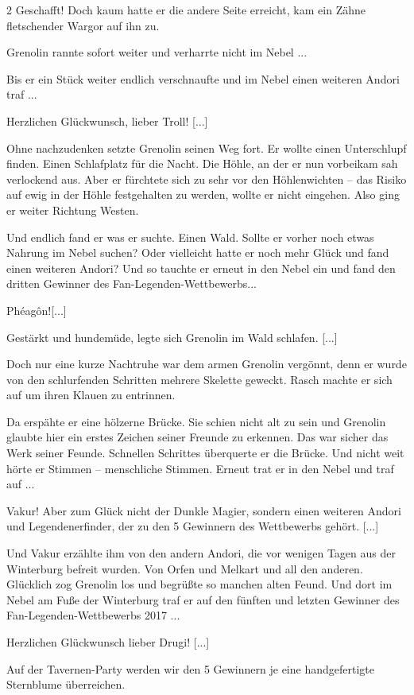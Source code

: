\documentclass[10pt, a4paper, oneside]{book}
\begin{document}
\begin{multicols}{2}
Geschafft! Doch kaum hatte er die andere Seite erreicht, kam ein Zähne fletschender Wargor auf ihn zu.

Grenolin rannte sofort weiter und verharrte nicht im Nebel ...

Bis er ein Stück weiter endlich verschnaufte und im Nebel einen weiteren Andori traf ...

Herzlichen Glückwunsch, lieber Troll! [...]

Ohne nachzudenken setzte Grenolin seinen Weg fort. Er wollte einen Unterschlupf finden. Einen Schlafplatz für die Nacht. Die Höhle, an der er nun vorbeikam sah verlockend aus. Aber er fürchtete sich zu sehr vor den Höhlenwichten – das Risiko auf ewig in der Höhle festgehalten zu werden, wollte er nicht eingehen. Also ging er weiter Richtung Westen.


Und endlich fand er was er suchte. Einen Wald. Sollte er vorher noch etwas Nahrung im Nebel suchen? Oder vielleicht hatte er noch mehr Glück und fand einen weiteren Andori?
Und so tauchte er erneut in den Nebel ein und fand den dritten Gewinner des Fan-Legenden-Wettbewerbs...

Phéagôn![...]

Gestärkt und hundemüde, legte sich Grenolin im Wald schlafen. [...]

Doch nur eine kurze Nachtruhe war dem armen Grenolin vergönnt, denn er wurde von den schlurfenden Schritten mehrere Skelette geweckt. Rasch machte er sich auf um ihren Klauen zu entrinnen.

Da erspähte er eine hölzerne Brücke. Sie schien nicht alt zu sein und Grenolin glaubte hier ein erstes Zeichen seiner Freunde zu erkennen. Das war sicher das Werk seiner Feunde. Schnellen Schrittes überquerte er die Brücke. Und nicht weit hörte er Stimmen – menschliche Stimmen. Erneut trat er in den Nebel und traf auf ...

Vakur! Aber zum Glück nicht der Dunkle Magier, sondern einen weiteren Andori und Legendenerfinder, der zu den 5 Gewinnern des Wettbewerbs gehört. [...]

Und Vakur erzählte ihm von den andern Andori, die vor wenigen Tagen aus der Winterburg befreit wurden. Von Orfen und Melkart und all den anderen. Glücklich zog Grenolin los und begrüßte so manchen alten Feund. Und dort im Nebel am Fuße der Winterburg traf er auf den fünften und letzten Gewinner des Fan-Legenden-Wettbewerbs 2017 ...

Herzlichen Glückwunsch lieber Drugi! [...]

Auf der Tavernen-Party werden wir den 5 Gewinnern je eine handgefertigte Sternblume überreichen.



\end{multicols}
\end{document}
